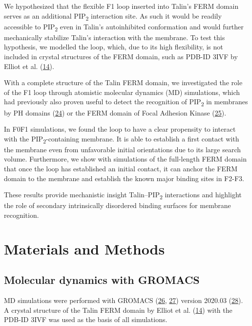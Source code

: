 \documentclass[
  twocolumn]{biophys-new-mod}
\begin{document}
We hypothesized that the flexible F1 loop inserted into Talin's FERM
domain serves as an additional PIP\textsubscript{2} interaction site. As
such it would be readily accessible to PIP\textsubscript{2} even in
Talin's autoinhibited conformation and would further mechanically
stabilize Talin's interaction with the membrane. To test this
hypothesis, we modelled the loop, which, due to its high flexibility, is
not included in crystal structures of the FERM domain, such as PDB-ID
3IVF by Elliot et al.
(\protect\hyperlink{ref-elliottStructureTalinHead2010}{14}).

With a complete structure of the Talin FERM domain, we investigated the
role of the F1 loop through atomistic molecular dynamics (MD)
simulations, which had previously also proven useful to detect the
recognition of PIP\textsubscript{2} in membranes by PH domains
(\protect\hyperlink{ref-buyanMultiscaleSimulationsSuggest2016}{24}) or
the FERM domain of Focal Adhesion Kinase
(\protect\hyperlink{ref-zhouMechanismFocalAdhesion2015}{25}).

In F0F1 simulations, we found the loop to have a clear propensity to
interact with the PIP\textsubscript{2}-containing membrane. It is able
to establish a first contact with the membrane even from unfavorable
initial orientations due to its large search volume. Furthermore, we
show with simulations of the full-length FERM domain that once the loop
has established an initial contact, it can anchor the FERM domain to the
membrane and establish the known major binding sites in F2-F3.

These results provide mechanistic insight Talin--PIP\textsubscript{2}
interactions and highlight the role of secondary intrinsically
disordered binding surfaces for membrane recognition.

\hypertarget{materials-and-methods}{%
\section{Materials and Methods}\label{materials-and-methods}}

\hypertarget{molecular-dynamics-with-gromacs}{%
\subsection{Molecular dynamics with
GROMACS}\label{molecular-dynamics-with-gromacs}}

MD simulations were performed with GROMACS
(\protect\hyperlink{ref-berendsenGROMACSMessagepassingParallel1995}{26},
\protect\hyperlink{ref-abrahamGROMACSHighPerformance2015}{27}) version
2020.03 (\protect\hyperlink{ref-lindahlGROMACS2020Source2020}{28}). A
crystal structure of the Talin FERM domain by Elliot et al.
(\protect\hyperlink{ref-elliottStructureTalinHead2010}{14}) with the
PDB-ID 3IVF was used as the basis of all simulations.
\end{document}
